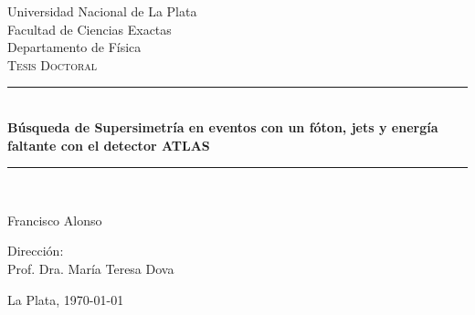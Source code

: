 \newcommand{\HRule}{\rule{\linewidth}{1pt}}

\begin{titlepage}
  \begin{center}


    {\large   Universidad Nacional de La Plata\\[0.2cm]
      Facultad de Ciencias Exactas \\[0.2cm]
      Departamento de F\'isica}\\[1.5cm]

    \textsc{\Large Tesis Doctoral}\\[0.5cm]

    \HRule \\[0.4cm]
           {
             \huge \bfseries B\'usqueda de Supersimetr\'ia en eventos con un f\'oton,
             jets y energ\'ia faltante con el detector ATLAS\\[0.4cm]
           }

    \HRule \\[1.5cm]

    \noindent
    \begin{minipage}{0.4\textwidth}
      \begin{flushleft} \large
        Francisco Alonso
      \end{flushleft}
    \end{minipage}%
    \begin{minipage}{0.4\textwidth}
      \begin{flushright} \large
        Direcci\'on: \\
        Prof. Dra. Mar\'ia Teresa Dova
      \end{flushright}
    \end{minipage}

    \vfill

    {\large La Plata, \today}

  \end{center}
\end{titlepage}

